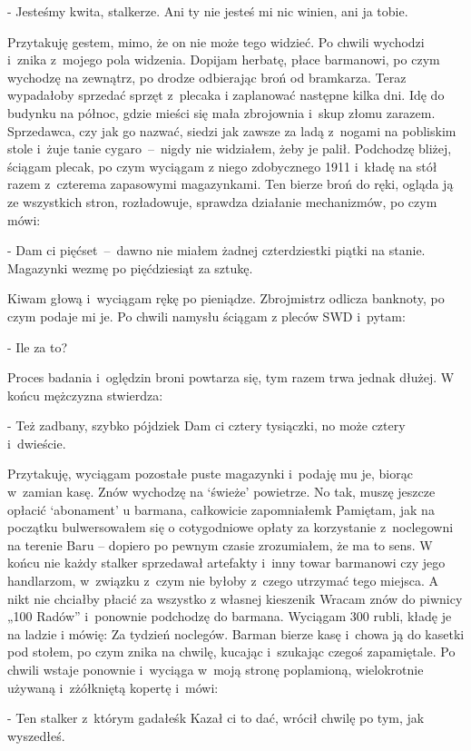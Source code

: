\documentclass[../MAIN.tex]{subfiles}
\begin{document}
- Jesteśmy kwita, stalkerze. Ani ty nie jesteś mi nic winien,
ani ja tobie.

Przytakuję gestem, mimo, że on nie może tego widzieć. Po chwili
wychodzi i~znika z~mojego pola widzenia. Dopijam herbatę, płace
barmanowi, po czym wychodzę na zewnątrz, po drodze odbierając
broń od bramkarza. Teraz wypadałoby sprzedać sprzęt z~plecaka i
zaplanować następne kilka dni. Idę do budynku na północ, gdzie
mieści się mała zbrojownia i~skup złomu zarazem. Sprzedawca,
czy jak go nazwać, siedzi jak zawsze za ladą z~nogami na
pobliskim stole i~żuje tanie cygaro~--~nigdy nie widziałem,
żeby
je palił. Podchodzę bliżej, ściągam plecak, po czym wyciągam z
niego zdobycznego 1911 i~kładę na stół razem z~czterema
zapasowymi magazynkami. Ten bierze broń do ręki, ogląda ją ze
wszystkich stron, rozładowuje, sprawdza działanie mechanizmów,
po czym mówi:

- Dam ci pięćset~--~dawno nie miałem żadnej czterdziestki
piątki
na stanie. Magazynki wezmę po pięćdziesiąt za sztukę.

Kiwam głową i~wyciągam rękę po pieniądze. Zbrojmistrz odlicza
banknoty, po czym podaje mi je. Po chwili namysłu ściągam z
pleców SWD i~pytam:

- Ile za to?

Proces badania i~oględzin broni powtarza się, tym razem trwa
jednak dłużej. W końcu mężczyzna stwierdza:

- Też zadbany, szybko pójdzie\3k Dam ci cztery tysiączki, no
może
cztery i~dwieście.

Przytakuję, wyciągam pozostałe puste magazynki i~podaję mu je,
biorąc w~zamian kasę. Znów wychodzę na ‘świeże’ powietrze. No
tak, muszę jeszcze opłacić ‘abonament’ u barmana, całkowicie
zapomniałem\3k Pamiętam, jak na początku bulwersowałem się o
cotygodniowe opłaty za korzystanie z~noclegowni na terenie Baru
– dopiero po pewnym czasie zrozumiałem, że ma to sens. W końcu
nie każdy stalker sprzedawał artefakty i~inny towar barmanowi
czy jego handlarzom, w~związku z~czym nie byłoby z~czego
utrzymać tego miejsca. A nikt nie chciałby płacić za wszystko z
własnej kieszeni\3k Wracam znów do piwnicy „100 Radów”
i~ponownie
podchodzę do barmana. Wyciągam 300 rubli, kładę je na ladzie i
mówię:
%
\sx Za tydzień noclegów.\qd
%
Barman bierze kasę i~chowa ją do kasetki pod stołem, po czym
znika na chwilę, kucając i~szukając czegoś zapamiętale. Po
chwili wstaje ponownie i~wyciąga w~moją stronę poplamioną,
wielokrotnie używaną i~zżółkniętą kopertę i~mówi:

- Ten stalker z~którym gadałeś\3k Kazał ci to dać, wrócił
chwilę
po tym, jak wyszedłeś.
\end{document}
